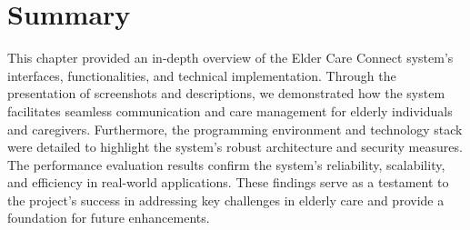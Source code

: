 \section{Summary}
This chapter provided an in-depth overview of the Elder Care Connect system’s interfaces, functionalities, and technical implementation. Through the presentation of screenshots and descriptions, we demonstrated how the system facilitates seamless communication and care management for elderly individuals and caregivers. Furthermore, the programming environment and technology stack were detailed to highlight the system’s robust architecture and security measures. The performance evaluation results confirm the system’s reliability, scalability, and efficiency in real-world applications. These findings serve as a testament to the project’s success in addressing key challenges in elderly care and provide a foundation for future enhancements.
